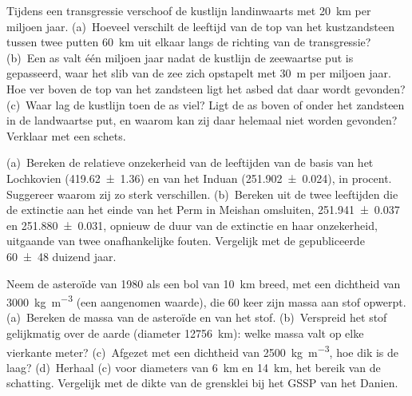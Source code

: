 \begin{exercise}[$\star\star$]\label{exo:b1:stratigraphic-scale:6}
Tijdens een transgressie verschoof de kustlijn landinwaarts met \qty{20}{km} per miljoen jaar. (a)~Hoeveel verschilt de leeftijd van de top van het kustzandsteen tussen twee putten \qty{60}{km} uit elkaar langs de richting van de transgressie? (b)~Een as valt één miljoen jaar nadat de kustlijn de zeewaartse put is gepasseerd, waar het slib van de zee zich opstapelt met \qty{30}{m} per miljoen jaar. Hoe ver boven de top van het zandsteen ligt het asbed dat daar wordt gevonden? (c)~Waar lag de kustlijn toen de as viel? Ligt de as boven of onder het zandsteen in de landwaartse put, en waarom kan zij daar helemaal niet worden gevonden? Verklaar met een schets.
\end{exercise}

\begin{exercise}[$\star\star$]\label{exo:b1:stratigraphic-scale:7}
(a)~Bereken de relatieve onzekerheid van de leeftijden van de basis van het Lochkovien (\qty[uncertainty-mode=separate]{419.62(136)}{\Ma}) en van het Induan (\qty[uncertainty-mode=separate]{251.902(24)}{\Ma}), in procent. Suggereer waarom zij zo sterk verschillen. (b)~Bereken uit de twee leeftijden die de extinctie aan het einde van het Perm in Meishan omsluiten, \qty[uncertainty-mode=separate]{251.941(37)}{\Ma} en \qty[uncertainty-mode=separate]{251.880(31)}{\Ma}, opnieuw de duur van de extinctie en haar onzekerheid, uitgaande van twee onafhankelijke fouten. Vergelijk met de gepubliceerde \num[uncertainty-mode=separate]{60 \pm 48} duizend jaar.
\end{exercise}

\begin{exercise}[$\star\star$]\label{exo:b1:stratigraphic-scale:8}
Neem de asteroïde van 1980 als een bol van \qty{10}{km} breed, met een dichtheid van \qty{3000}{kg.m^{-3}} (een aangenomen waarde), die 60 keer zijn massa aan stof opwerpt. (a)~Bereken de massa van de asteroïde en van het stof. (b)~Verspreid het stof gelijkmatig over de aarde (diameter \qty{12756}{km}): welke massa valt op elke vierkante meter? (c)~Afgezet met een dichtheid van \qty{2500}{kg.m^{-3}}, hoe dik is de laag? (d)~Herhaal (c) voor diameters van \qty{6}{km} en \qty{14}{km}, het bereik van de schatting. Vergelijk met de dikte van de grensklei bij het GSSP van het Danien.
\end{exercise}

